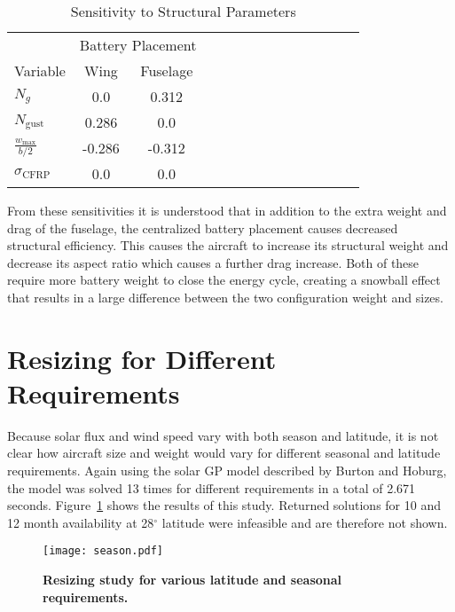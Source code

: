 \documentclass[]{aiaa-tc}%
\begin{document}
\begin{longtable}{lccccccccccccc}
    \caption{Sensitivity to Structural Parameters}\\
    \toprule
    \toprule
    \label{t:fusesens}
                                    & \multicolumn{2}{c}{Battery Placement} \\
    Variable                        & Wing    &  Fuselage   \\ \hline
    $N_g$                           & 0.0     & 0.312       \\
    $N_{\mathrm{gust}}$             & 0.286   & 0.0         \\
    $\frac{w_{\text{max}}}{b/2}$    &  -0.286 & -0.312      \\
    $\sigma_{\mathrm{CFRP}}$        & 0.0     & 0.0         \\
    \bottomrule
\end{longtable}

From these sensitivities it is understood that in addition to the extra weight and drag of the fuselage, the centralized battery placement causes decreased structural efficiency. 
This causes the aircraft to increase its structural weight and decrease its aspect ratio which causes a further drag increase.  
Both of these require more battery weight to close the energy cycle, creating a snowball effect that results in a large difference between the two configuration weight and sizes. 

\section{Resizing for Different Requirements}

Because solar flux and wind speed vary with both season and latitude, it is not clear how aircraft size and weight would vary for different seasonal and latitude requirements.  
Again using the solar GP model described by Burton and Hoburg, the model was solved 13 times for different requirements in a total of 2.671 seconds.  
Figure~\ref{f:season} shows the results of this study. 
Returned solutions for 10 and 12 month availability at 28$^{\circ}$ latitude were infeasible and are therefore not shown.  

\begin{figure}[h!]
	\begin{center}
	\texttt{[image: season.pdf]}
    \caption{\textbf{Resizing study for various latitude and seasonal requirements. }}
	\label{f:season}
	\end{center}
\end{figure}
\end{document}
